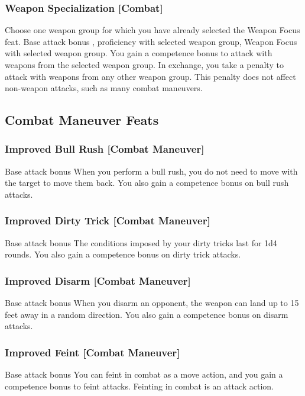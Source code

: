 \subsubsection{Weapon Specialization [Combat]}
Choose one weapon group for which you have already selected the Weapon Focus feat.
 Base attack bonus , proficiency with selected weapon group, Weapon Focus with selected weapon group.
\featben You gain a  competence bonus to attack with weapons from the selected weapon group. In exchange, you take a  penalty to attack with weapons from any other weapon group. This penalty does not affect non-weapon attacks, such as many combat maneuvers.

\subsection{Combat Maneuver Feats}

\subsubsection{Improved Bull Rush [Combat Maneuver]}
 Base attack bonus 
 When you perform a bull rush, you do not need to move with the target to move them back. You also gain a  competence bonus on bull rush attacks.

\subsubsection{Improved Dirty Trick [Combat Maneuver]}
 Base attack bonus 
 The conditions imposed by your dirty tricks last for 1d4 rounds. You also gain a  competence bonus on dirty trick attacks.

\subsubsection{Improved Disarm [Combat Maneuver]}
 Base attack bonus 
 When you disarm an opponent, the weapon can land up to 15 feet away in a random direction. You also gain a  competence bonus on disarm attacks.

\subsubsection{Improved Feint [Combat Maneuver]}
 Base attack bonus 
 You can feint in combat as a move action, and you gain a  competence bonus to feint attacks.
 Feinting in combat is an attack action.

